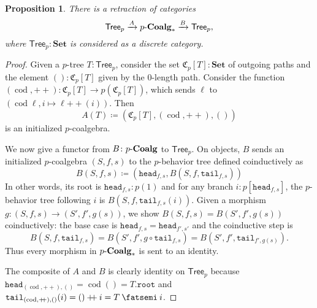 \documentclass[11pt, one side, article]{memoir}
\theoremstyle{definition}
\theoremstyle{plain}
\newtheorem{proposition}[definitionx]{Proposition}
\DeclareMathOperator{\cod}{cod}
\newcommand{\Set}[1]{\mathsf{#1}}%
\newcommand{\Cat}[1]{\mathbf{#1}}%
\newcommand{\then}{\mathbin{\fatsemi}}
\newcommand{\To}[2][]{\xrightarrow[#1]{#2}}
\newcommand{\tn}[1]{\textnormal{#1}}
\newcommand{\smset}{\Cat{Set}}
\newcommand{\plpl}{\mathbin{+\!\!+}}
\newcommand{\Cofree}{\mathfrak{C}}
\newcommand{\tree}{\Set{Tree}}
\newcommand{\rt}{\texttt{root}}
\newcommand{\hd}{\texttt{head}}
\newcommand{\tl}{\texttt{tail}}
\newcommand{\coalg}{\tn{-}\Cat{Coalg}}
\begin{document}
\begin{proposition}
There is a retraction of categories
\[
\tree_p\To{A} p\coalg_*\To{B}\tree_p,\]
where $\tree_p:\smset$ is considered as a discrete category.
\end{proposition}
\begin{proof}
Given a $p$-tree $T:\tree_p$, consider the set $\Cofree_p[T]:\smset$ of outgoing paths and the element $():\Cofree_p[T]$ given by the $0$-length path. Consider the function $(\cod,\plpl)\colon \Cofree_p[T]\to p(\Cofree_p[T])$, which sends $\ell$ to $(\cod\ell,i\mapsto \ell\plpl(i))$.
Then
\[A(T)\coloneqq(\Cofree_p[T],(\cod,\plpl),())\]
is an initialized $p$-coalgebra.

We now give a functor from $B\colon p\coalg$ to $\tree_p$. On objects, $B$ sends an initialized $p$-coalgebra $(S,f,s)$ to the $p$-behavior tree defined coinductively as
\[
	B(S,f,s)\coloneqq(\hd_{f,s},B(S,f,\tl_{f,s}))
\]
In other words, its root is $\hd_{f,s}:p(1)$ and for any branch $i:p[\hd_{f,s}]$, the $p$-behavior tree following $i$ is $B(S,f,\tl_{f,s}(i))$. Given a morphism $g\colon (S,f,s)\to (S',f',g(s))$, we show $B(S,f,s)=B(S',f',g(s))$ coinductively: the base case is $\hd_{f,s}=\hd_{f',s'}$ and the coinductive step is
\[
B(S,f,\tl_{f,s})=B(S',f',g\circ\tl_{f,s})=B(S',f',\tl_{f',g(s)}).
\]
Thus every morphism in $p\coalg_*$ is sent to an identity. 

The composite of $A$ and $B$ is clearly identity on $\tree_p$ because $\hd_{(\cod,\plpl),()}=\cod()=T.\rt$ and $\tl_{(\cod,\plpl),()}(i)=()\plpl i=T\then i$.
\end{proof}
\end{document}
